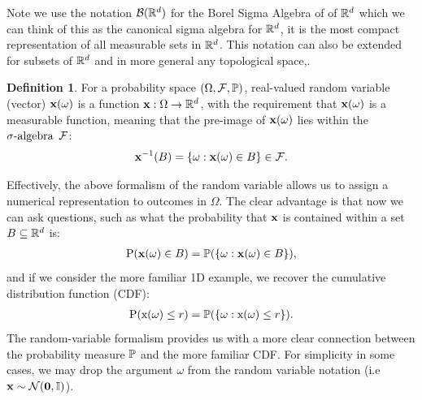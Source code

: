 \documentclass[a4paper,12pt,twoside,openright]{report}
\theoremstyle{definition}
\newtheorem{definition}{Definition}[section]
\begin{document}
Note we use the notation $\calB(\R^d)$ for the Borel Sigma Algebra of of $\R^d$ which we can think of this as the canonical sigma algebra for $\R^d$, it is the most compact representation of all measurable sets in $\R^d$. This notation can also be extended for subsets of $\R^d$ and in more general any topological space,.

\begin{definition}\label{def:random_variable}
For a probability space $\probspace$, real-valued random variable (vector) $\rvx(\omega)$ is a function $\rvx :\Omega \rightarrow \R^d$, with the requirement that $\rvx(\omega)$ is a measurable function, meaning that the pre-image of $\rvx(\omega)$  lies within the $\sigalg$ $\calF$:
\begin{align*}
    \rvx^{-1}(B)= \{\omega : \rvx(\omega) \in B \} \in \calF .
\end{align*}
\end{definition}
Effectively, the above formalism of the random variable allows us to assign a numerical representation to outcomes in $\Omega$. The clear advantage is that now we can ask questions, such as what the probability that $\rvx$ is contained within a set $B \subseteq \R^d$ is:
\begin{align*}
     \text{P}(\rvx(\omega) \in B) = \P( \{\omega : \rvx(\omega) \in B \} ),
\end{align*}
 and if we consider the more familiar 1D example, we recover the cumulative distribution function (CDF):
 \begin{align*}
     \text{P}(\rx(\omega) \leq r) = \P( \{\omega : \rx(\omega) \leq r \} ).
 \end{align*}
 The random-variable formalism provides us with a more clear connection between the probability measure $\P$ and the more familiar CDF. For simplicity in some cases, we may drop the argument $\omega$ from the random variable notation (i.e $\rvx \sim \calN(\bm{0}, \mathbb{I})$). 
\end{document}
